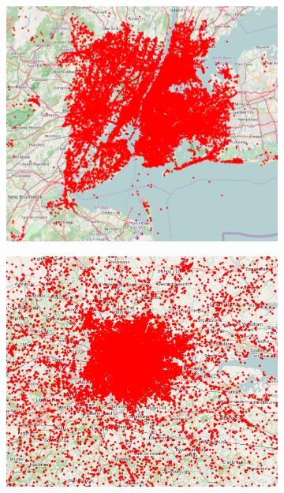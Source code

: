 \begin{figure}[htbp]
	\medskip
	\centering
	\begin{subfigure}[htbp]{0.3\textwidth}
		\centering
		\includegraphics[width=1\linewidth]{figures/nyc_points.png}
		\caption{}
		\label{subfig:nyc_points}
	\end{subfigure}
	\quad
	\begin{subfigure}[htbp]{0.3\textwidth}
		\centering
		\includegraphics[width=1\linewidth]{figures/london_points.png}
		\caption{}
		\label{subfig:london_points}
	\end{subfigure}

\end{figure}
